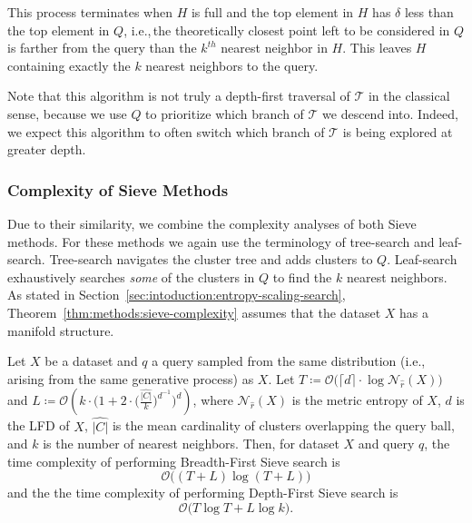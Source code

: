 This process terminates when $H$ is full and the top element in $H$ has $\delta$ less than the top element in $Q$, i.e.,\,the theoretically closest point left to be considered in $Q$ is farther from the query than the $k^{th}$ nearest neighbor in $H$.
This leaves $H$ containing exactly the $k$ nearest neighbors to the query.

Note that this algorithm is not truly a depth-first traversal of $\mathcal{T}$ in the classical sense, because we use $Q$ to prioritize which branch of $\mathcal{T}$ we descend into.
Indeed, we expect this algorithm to often switch which branch of $\mathcal{T}$ is being explored at greater depth.


\subsubsection{Complexity of Sieve Methods}
\label{sec:methods:knn-search:complexity-of-sieve-methods}

Due to their similarity, we combine the complexity analyses of both Sieve methods.
For these methods we again use the terminology of tree-search and leaf-search.
Tree-search navigates the cluster tree and adds clusters to $Q$.
Leaf-search exhaustively searches \textit{some} of the clusters in $Q$ to find the $k$ nearest neighbors.
As stated in Section~\ref{sec:intoduction:entropy-scaling-search}, Theorem~\ref{thm:methods:sieve-complexity} assumes that the dataset $X$ has a manifold structure.

\begin{theorem}
    Let $X$ be a dataset and $q$ a query sampled from the same distribution (i.e., arising from the same generative process) as $X$. Let $T \coloneqq \mathcal{O} \big( \lceil d \rceil \cdot \log \mathcal{N}_{\hat{r}}(X) \big)$ and   $L \coloneqq \mathcal{O} \left( k \cdot \bigg( 1 + 2 \cdot \Big( \frac{\hat{|C|}}{k} \Big) ^ {d^{-1}} \bigg)^d \right)$, where $\mathcal{N}_{\hat{r}}(X)$ is the metric entropy of $X$, $d$ is the LFD of $X$, $\hat{|C|}$ is the mean cardinality of clusters overlapping the query ball, and $k$ is the number of nearest neighbors. Then, for dataset $X$ and query $q$, the time complexity of performing Breadth-First Sieve search is \begin{equation}
        \mathcal{O} \Big( (T + L ) \log (T + L ) \Big)
        \label{eq:methods:breadth-first-sieve-complexity}
    \end{equation} and the the time complexity of performing Depth-First Sieve search is \begin{equation}
        \mathcal{O} \Big( T \log T + L \log k \Big).
        \label{eq:methods:depth-first-sieve-complexity}
    \end{equation}
    \label{thm:methods:sieve-complexity}
\end{theorem}

